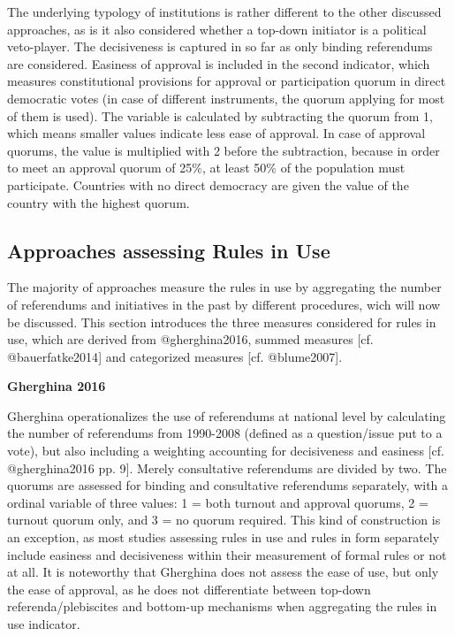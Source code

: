 \documentclass[]{article}
\begin{document}
The underlying typology of institutions is rather different to the other
discussed approaches, as is it also considered whether a top-down
initiator is a political veto-player. The decisiveness is captured in so
far as only binding referendums are considered. Easiness of approval is
included in the second indicator, which measures constitutional
provisions for approval or participation quorum in direct democratic
votes (in case of different instruments, the quorum applying for most of
them is used). The variable is calculated by subtracting the quorum from
1, which means smaller values indicate less ease of approval. In case of
approval quorums, the value is multiplied with 2 before the subtraction,
because in order to meet an approval quorum of 25\%, at least 50\% of
the population must participate. Countries with no direct democracy are
given the value of the country with the highest quorum.

\subsection{Approaches assessing Rules in
Use}\label{approaches-assessing-rules-in-use}

The majority of approaches measure the rules in use by aggregating the
number of referendums and initiatives in the past by different
procedures, wich will now be discussed. This section introduces the
three measures considered for rules in use, which are derived from
@gherghina2016, summed measures {[}cf. @bauerfatke2014{]} and
categorized measures {[}cf. @blume2007{]}.

\textbf{Gherghina 2016}

Gherghina operationalizes the use of referendums at national level by
calculating the number of referendums from 1990-2008 (defined as a
question/issue put to a vote), but also including a weighting accounting
for decisiveness and easiness {[}cf. @gherghina2016 pp. 9{]}. Merely
consultative referendums are divided by two. The quorums are assessed
for binding and consultative referendums separately, with a ordinal
variable of three values: 1 = both turnout and approval quorums, 2 =
turnout quorum only, and 3 = no quorum required. This kind of
construction is an exception, as most studies assessing rules in use and
rules in form separately include easiness and decisiveness within their
measurement of formal rules or not at all. It is noteworthy that
Gherghina does not assess the ease of use, but only the ease of
approval, as he does not differentiate between top-down
referenda/plebiscites and bottom-up mechanisms when aggregating the
rules in use indicator.
\end{document}
